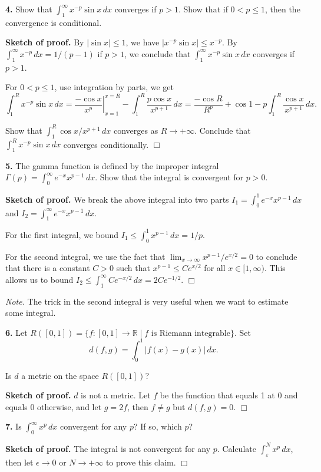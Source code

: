 \documentclass{article}
\begin{document}
    \textbf{4.} Show that $\int_1^{\infty} x^{-p}\sin x \, dx$ converges if
$p > 1$. Show that if $0 < p ≤ 1$, then the convergence is conditional.

    \textbf{Sketch of proof.} By $|\sin x | \le 1$, we have
$|x^{-p}\sin x| \le x^{-p}$. By $\int_1^{\infty} x^{-p}\,dx = 1/(p-1)$
if $p > 1$, we conclude that $\int_1^{\infty}x^{-p}\sin x \,dx$
converges if $p > 1$.

For $0 < p \le 1$, use integration by parts, we get
\[\int_1^R x^{-p}\sin x \,dx =\left. \frac{-\cos x}{x^p}\right|^{x=R}_{x= 1} - \int_1^R \frac{p\cos x}{x^{p+1}}\,dx= \frac{-\cos R}{R^p} + \cos 1 - p \int_1^R \frac{\cos x }{x^{p+1}}\,dx.\]

Show that $\int_1^R \cos x /x^{p+1}\,dx$ converges as $R\to +\infty$.
Conclude that $\int_1^R x^{-p}\sin x \,dx$ converges conditionally.
$\Box$

    \textbf{5.} The gamma function is defined by the improper integral
$\Gamma (p) = \int_0^{\infty} e^{-x} x^{p-1} \,dx$. Show that the
integral is convergent for $p > 0$.

    \textbf{Sketch of proof.} We break the above integral into two parts
$I_1 = \int_0^{1} e^{-x} x^{p-1} \,dx$ and
$I_2 = \int_1^{\infty} e^{-x} x^{p-1} \,dx$.

For the first integral, we bound
$I_1 \le  \int_0^{1} x^{p-1} \,dx = 1/p$.

For the second integral, we use the fact that
$\lim_{x\to \infty } x^{p-1}/e^{x/2} = 0$ to conclude that there is a
constant $C > 0$ such that $x^{p-1}\le Ce^{x/2}$ for all
$x\in [1, \infty)$. This allows us to bound
$I_2\le \int_1^{\infty} Ce^{-x/2} \,dx= 2Ce^{-1/2}$. $\Box$

\emph{Note.} The trick in the second integral is very useful when we
want to estimate some integral.

    \textbf{6.} Let
$R([0, 1]) = \{f : [0, 1] → \mathbb{R} \mid f \text{ is Riemann integrable}\}$.
Set \[d(f,g) = \int_0^1 |f (x) − g(x)|\,dx.\]

Is $d$ a metric on the space $R([0, 1])$?

    \textbf{Sketch of proof.} $d$ is not a metric. Let $f$ be the function
that equals 1 at 0 and equals 0 otherwise, and let $g = 2f$, then
$f \neq g$ but $d(f, g) = 0$. $\Box$

    \textbf{7.} Is $\int_0^{\infty}x^p \,dx$ convergent for any $p$? If so,
which $p$?

    \textbf{Sketch of proof.} The integral is not convergent for any $p$.
Calculate $\int_{\varepsilon}^{N}x^p \,dx$, then let $\epsilon \to 0$ or
$N\to +\infty$ to prove this claim. $\Box$
\end{document}
